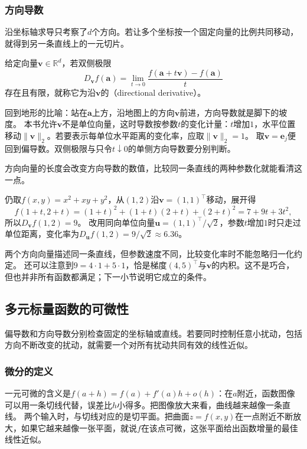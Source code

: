 \subsubsection{方向导数}

沿坐标轴求导只考察了$d$个方向。若让多个坐标按一个固定向量的比例共同移动，就得到另一条直线上的一元切片。
\begin{definition}[方向导数]
\label{def:multivariable-directional-derivative}
给定向量$\bm v\in\mathbb R^d$，若双侧极限
\[
 D_{\bm v}f(\bm a)
 =\lim_{t\to0}\frac{f(\bm a+t\bm v)-f(\bm a)}t
\]
存在且有限，就称它为沿$\bm v$的（directional derivative）。
\end{definition}
回到地形的比喻：站在$\bm a$上方，沿地图上的方向$\bm v$前进，方向导数就是脚下的坡度。
本书允许$\bm v$不是单位向量，这时导数按参数$t$的变化计量：$t$增加$1$，水平位置移动$\lVert\bm v\rVert_2$。若要表示每单位水平距离的变化率，应取$\lVert\bm v\rVert_2=1$。
取$\bm v=\bm e_j$便回到偏导数。双侧极限与只令$t\downarrow0$的单侧方向导数要分别判断。

方向向量的长度会改变方向导数的数值，比较同一条直线的两种参数化就能看清这一点。
\begin{example}[沿对角方向的方向导数]
\label{ex:multivariable-diagonal-directional-derivative}
仍取$f(x,y)=x^2+xy+y^2$，从$(1,2)$沿$\bm v=(1,1)^\top$移动，展开得
\[
 f(1+t,2+t)=(1+t)^2+(1+t)(2+t)+(2+t)^2=7+9t+3t^2,
\]
所以$D_{\bm v}f(1,2)=9$。
改用同向单位向量$\bm u=(1,1)^\top/\sqrt2$，参数$t$增加$1$时只走过单位距离，变化率为$D_{\bm u}f(1,2)=9/\sqrt2\approx6.36$。
\end{example}

两个方向向量描述同一条直线，但参数速度不同，比较变化率时不能忽略归一化约定。
还可以注意到$9=4\cdot1+5\cdot1$，恰是梯度$(4,5)^\top$与$\bm v$的内积。这不是巧合，但也并非所有函数都满足；下一小节说明它成立的条件。

\subsection{多元标量函数的可微性}
\label{sec:multivariable-total-differentiation}

偏导数和方向导数分别检查固定的坐标轴或直线。若要同时控制任意小扰动，包括方向不断改变的扰动，就需要一个对所有扰动共同有效的线性近似。

\subsubsection{微分的定义}

一元可微的含义是$f(a+h)=f(a)+f'(a)h+o(h)$：在$a$附近，函数图像可以用一条切线代替，误差比$h$小得多。把图像放大来看，曲线越来越像一条直线。
两个输入时，与切线对应的是切平面。把曲面$z=f(x,y)$在一点附近不断放大，如果它越来越像一张平面，就说$f$在该点可微，这张平面给出函数增量的最佳线性近似。

